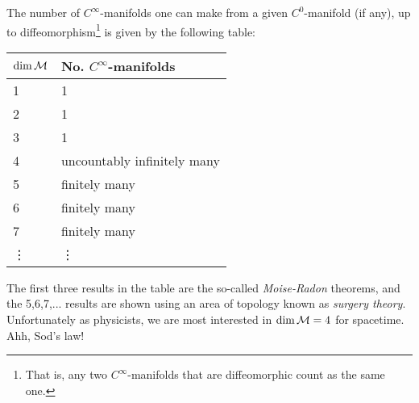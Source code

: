 \bt 
    The number of $C^{\infty}$-manifolds one can make from a given $C^0$-manifold (if any), up to diffeomorphism\footnote{That is, any two $C^{\infty}$-manifolds that are diffeomorphic count as the same one.} is given by the following table:
    \begin{center}
	    \begin{tabular}{@{} p{2.5cm}p{5cm}@{}}
		    \toprule
		    $\dim\mathcal{M}$ & No. $C^{\infty}$-manifolds \\
		    \midrule 
		    1 & 1 \\
		    2 & 1 \\
		    3 & 1 \\
		    4 &  uncountably infinitely many\\
		    5 & finitely many \\
		    6 & finitely many \\
		    7 & finitely many \\
		    \vdots & \vdots \\
		    \bottomrule
	    \end{tabular}
    \end{center}
\et 

\noindent The first three results in the table are the so-called \textit{Moise-Radon} theorems, and the 5,6,7,... results are shown using an area of topology known as \textit{surgery theory}. Unfortunately as physicists, we are most interested in $\dim\mathcal{M}=4$ for spacetime. Ahh, Sod's law!